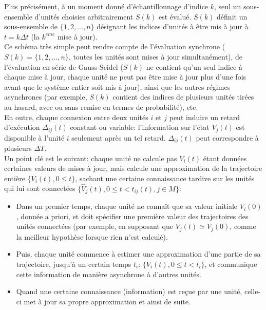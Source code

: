 Plus précisément, à un moment donné d'échantillonnage d'indice $k$, seul un sous-ensemble d'unités choisies arbitrairement $S(k)$ est évalué. $S(k)$ définit un sous-ensemble de $\{1,2, ..., n \}$ désignant les indices d'unités à être mis à jour à $ t = k \Delta t$ (la $ k ^ {eme} $ mise à jour).\\

Ce schéma très simple peut rendre compte de l'évaluation synchrone ($ S (k) = \{1,2, ..., n \} $, toutes les unités sont mises à jour simultanément), de l'évaluation en série de Gauss-Seidel ($S(k)$ ne contient qu'un seul indice à chaque mise à jour, chaque unité ne peut pas être mise à jour plus d'une fois avant que le système entier soit mis à jour), ainsi que les autres régimes asynchrones (par exemple, $S(k)$ contient des indices de plusieurs unités tirées au hasard, avec ou sans remise en termes de probabilité), etc.\\

En outre, chaque connexion entre deux unités $i$ et $j$ peut induire un retard d'exécution $ \Delta_ {ij}(t) $ constant ou variable: l'information sur l'état $V_j(t)$ est disponible à l'unité $i$ seulement après un tel retard. $\Delta_{ij}(t)$ peut correspondre à plusieurs $\Delta T$.\\

Un point clé est le suivant: chaque unité ne calcule pas $V_i (t)$ étant données certaines valeurs de mises à jour, mais calcule une approximation de la trajectoire entière $ \{V_i (t), 0 \leq t \} $, sachant une certaine connaissance tardive sur les unités qui lui sont connectées $ \{\hat {V} _j (t), 0 \leq t <t_ {ij} (t), j \in M ​​\} $:\\ 

\begin {itemize}
\item Dans un premier temps, chaque unité ne connaît que sa valeur initiale $ V_i (0) $, donnée a priori, et doit spécifier une première valeur des trajectoires des unités connectées (par exemple, en supposant que $ V_j (t) \simeq V_j (0) $, comme la meilleur hypothèse lorsque rien n'est calculé).

\item Puis, chaque unité commence à estimer une approximation d'une partie de sa trajectoire, jusqu'à un certain temps $t_i$: $ \{V_i (t), 0 \leq t <t_i \} $, et communique cette information de manière asynchrone à d'autres unités.

\item Quand une certaine connaissance (information) est reçue par une unité, celle-ci met à jour sa propre approximation et ainsi de suite.\\
\end {itemize}

